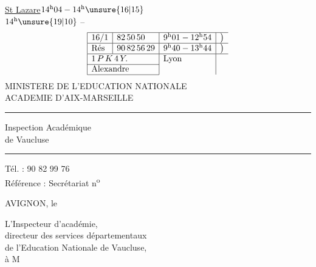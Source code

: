 \uline{St Lazare}\quad $14^{\rm h}04-14^{\rm h}\unsure{16|15}$\\
$14^{\rm h}\unsure{19|10}$ --\\
\[
\begin{array}{|l|l|l|l}
\hline
16/1&82\,50\,50&9^{\rm h}01-12^{\rm h}54&\big)\\
\hline
\text{Rés}&90\,82\,56\,29&9^{\rm h}40-13^{\rm h}44&\big)\\
\hline
\multicolumn{2}{|l|}{1\,P\,K\,4\,Y.}&\text{Lyon}\\
\cline{1-2}
\multicolumn{2}{|l|}{\text{Alexandre}}&\\
\cline{1-2}
\end{array}
\]
MINISTERE DE L'EDUCATION NATIONALE\\
ACADEMIE D'AIX-MARSEILLE\\
\rule{1cm}{0.3pt}

Inspection Académique\\
de Vaucluse\\
\rule{1cm}{0.3pt}

Tél. : 90 82 99 76\\
Référence : Secrétariat n\textsuperscript{o}

AVIGNON, le

L'Inspecteur d'académie,\\
directeur des services départementaux\\
de l'Education Nationale de Vaucluse,\\
à M



